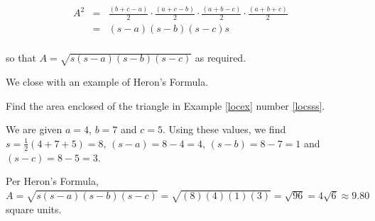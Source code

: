 \documentclass{ximera}
\begin{document}
\[ \begin{array}{rclr}

A^2 & = & \frac{(b+c-a)}{2} \cdot \frac{(a+c-b)}{2} \cdot \frac{(a+b-c)}{2} \cdot \frac{(a+b+c)}{2}  &  \\  	 
	 	
	 	& = & (s-a) (s-b) (s-c) s  &  \\  	 	
	 	
\end{array} \]

so that  $A = \sqrt{s(s-a)(s-b)(s-c)}$ as required. 

 

We close with an example of Heron's Formula.

\begin{example} \label{heronex}  Find the area enclosed of the triangle in Example \ref{locex} number \ref{locsss}.



\begin{explanation} We are given $a = 4$, $b=7$ and $c = 5$.  Using these values, we find $s = \frac{1}{2}(4+7+5) = 8$, $(s - a) = 8 - 4 = 4$, $(s-b) = 8-7 =1$ and $(s-c) = 8-5=3$. 

 

Per Heron's Formula,  $A = \sqrt{s(s-a)(s-b)(s-c)} = \sqrt{(8)(4)(1)(3)} = \sqrt{96} = 4\sqrt{6} \approx 9.80$ square units. 
\end{explanation}
\end{example}


\closegraphsfile
\end{document}
